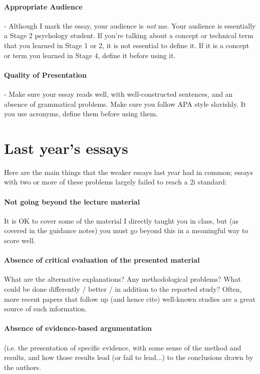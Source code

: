 \documentclass[11pt]{article}
\begin{document}
\paragraph{Appropriate Audience} - Although I mark the essay, your audience is \emph{not} me. Your audience is essentially a Stage 2 psychology student. If you're talking about a concept or technical term that you learned in Stage 1 or 2, it is not essential to define it. If it is a concept or term you learned in Stage 4, define it before using it.

\paragraph{Quality of Presentation} - Make sure your essay reads well, with well-constructed sentences, and an absence of grammatical problems. Make sure you follow APA style slavishly. It you use acronyms, define them before using them.

\section{Last year's essays}

Here are the main things that the weaker essays last year had in common; essays with two or more of these problems largely failed to reach a 2i
standard: 

\paragraph{Not going beyond the lecture material} It is OK to cover
some of the material I directly taught you in class, but (as covered
in the guidance notes) you must go beyond this in a meaningful way to
score well.

\paragraph{Absence of critical evaluation of the presented material}
What are the alternative explanations? Any methodological problems?
What could be done differently / better / in addition to the reported
study?  Often, more recent papers that follow up (and hence cite)
well-known studies are a great source of such information.

\paragraph{Absence of evidence-based argumentation} (i.e. the
presentation of specific evidence, with some sense of the method and
results, and how those results lead (or fail to lead...) to the
conclusions drawn by the authors.
\end{document}
